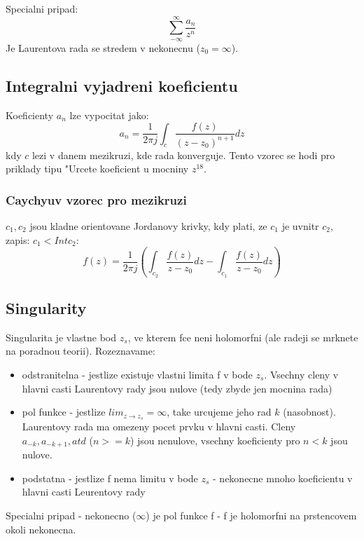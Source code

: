 Specialni pripad:
$$\sum_{-\infty}^\infty \frac{a_n}{z^n}$$
Je Laurentova rada se stredem v nekonecnu ($z_0 = \infty$).

\subsection*{Integralni vyjadreni koeficientu}
Koeficienty $a_n$ lze vypocitat jako:
\begin{equation}
\label{eq:lau_koef}
a_n = \frac{1}{2 \pi j} \int_{c} \frac{f(z)}{(z-z_0)^{n+1}}dz
\end{equation}
 kdy $c$ lezi v danem mezikruzi, kde rada konverguje.
Tento vzorec se hodi pro priklady tipu "Urcete koeficient u mocniny $z^{18}$.

\subsubsection*{Caychyuv vzorec pro mezikruzi}
$c_1, c_2$ jsou kladne orientovane Jordanovy krivky, kdy plati, ze $c_1$ je uvnitr $c_2$, zapis: $c_1 < Int c_2$:
\begin{equation}
\label{eq:lau_cauch}
f(z) = \frac{1}{2\pi j} \left( \int_{c_2} \frac{f(z)}{z-z_0}dz - \int_{c_1}\frac{f(z)}{z-z_0}dz \right)
\end{equation}

\subsection*{Singularity}
Singularita je vlastne bod $z_s$, ve kterem fce neni holomorfni (ale radeji se mrknete na poradnou teorii). Rozeznavame:
\begin{itemize}
\item odstranitelna - jestlize existuje vlastni limita f v bode $z_s$. Vsechny cleny v hlavni casti Laurentovy rady jsou nulove (tedy zbyde jen mocnina rada)
\item pol funkce - jestlize $lim_{z \to z_s} = \infty$, take urcujeme jeho rad $k$ (nasobnost). Laurentovy rada ma omezeny pocet prvku v hlavni casti. Cleny $a_{-k}, a_{-k+1}, atd$ ($n>=k$) jsou nenulove, vsechny koeficienty pro $n<k$ jsou nulove. 
\item podstatna - jestlize f nema limitu v bode $z_s$ - nekonecne mnoho koeficientu v hlavni casti Leurentovy rady
\end{itemize}

Specialni pripad - nekonecno ($\infty$) je pol funkce f - f je holomorfni na prstencovem okoli nekonecna. 


